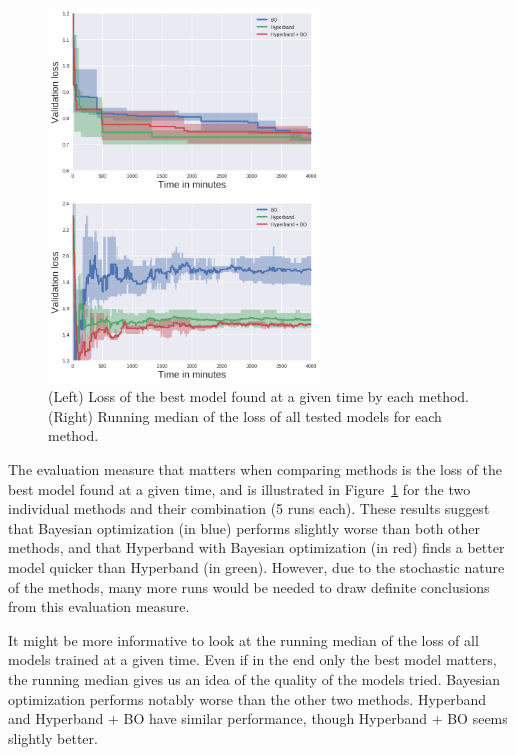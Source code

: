 \begin{figure}[htb]
	\begin{minipage}[b]{.49\linewidth}
		\centering
		\centerline{\includegraphics[width=7.2cm]{img_hyperopt/cifar_10_aggregate_best_val_loss_per_minute}}
	\end{minipage}
	\begin{minipage}[b]{.49\linewidth}
		\centering
		\centerline{\includegraphics[width=7.2cm]{img_hyperopt/cifar_10_aggregate_median_val_loss_per_minute}}
	\end{minipage}
	\caption{(Left) Loss of the best model found at a given time by each method. (Right) Running median of the loss of all tested models for each method.}
	\label{fig:combining_loss}
\end{figure}

The evaluation measure that matters when comparing methods is the loss of the best model found at a given time, and is illustrated in Figure~\ref{fig:combining_loss} for the two individual methods and their combination (5 runs each). 
These results suggest that Bayesian optimization (in blue) performs slightly worse than both other methods, and that Hyperband with Bayesian optimization (in red) finds a better model quicker than Hyperband (in green). However, due to the stochastic nature of the methods, many more runs would be needed to draw definite conclusions from this evaluation measure. 

It might be more informative to look at the running median of the loss of all models trained at a given time. Even if in the end only the best model matters, the running median gives us an idea of the quality of the models tried. Bayesian optimization performs notably worse than the other two methods. Hyperband and Hyperband + BO have similar performance, though Hyperband + BO seems slightly better.

